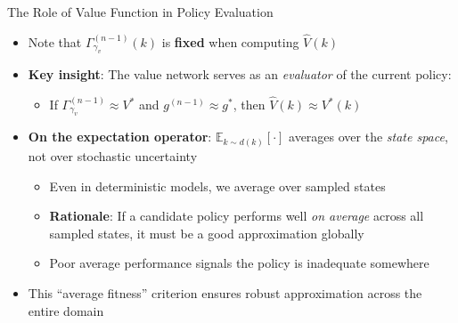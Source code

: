 \documentclass[10pt,english,aspectratio=169]{beamer}
\begin{document}
\begin{frame}{The Role of Value Function in Policy Evaluation}
\begin{itemize}
  \item Note that $\Gamma_{\gamma_v}^{(n-1)}(k)$ is \textbf{fixed} when computing $\hat{V}(k)$
  \medskip
  \item \textbf{Key insight}: The value network serves as an \emph{evaluator} of the current policy:
    \begin{itemize}
      \item If $\Gamma_{\gamma_v}^{(n-1)} \approx V^*$ and $g^{(n-1)} \approx g^*$, then $\hat{V}(k) \approx V^*(k)$
    \end{itemize}
  \medskip
  \item \textbf{On the expectation operator}: $\mathbb{E}_{k \sim d(k)}[\cdot]$ averages over the \emph{state space}, not over stochastic uncertainty
    \begin{itemize}
      \item Even in deterministic models, we average over sampled states
      \item \textbf{Rationale}: If a candidate policy performs well \emph{on average} across all sampled states, it must be a good approximation globally
      \item Poor average performance signals the policy is inadequate somewhere
    \end{itemize}
  \medskip
  \item This ``average fitness'' criterion ensures robust approximation across the entire domain
\end{itemize}
\end{frame}
\end{document}
